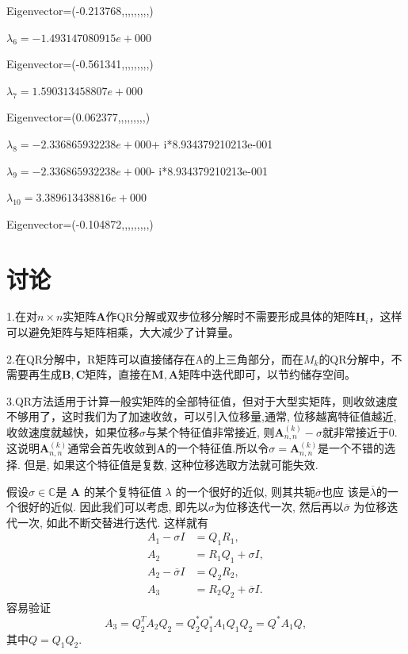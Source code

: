 \begin{landscape}
Eigenvector=(-0.213768,,,,,,,,,)


\vbox{}
$\lambda_{6}= -1.493147080915e+000$ 

Eigenvector=(-0.561341,,,,,,,,,)


\vbox{}
$\lambda_{7}= 1.590313458807e+000$ 

Eigenvector=(0.062377,,,,,,,,,)


\vbox{}
$\lambda_{8}= -2.336865932238e+000$+ i*8.934379210213e-001


\vbox{}
$\lambda_{9}= -2.336865932238e+000$- i*8.934379210213e-001


\vbox{}
$\lambda_{10}= 3.389613438816e+000$ 

Eigenvector=(-0.104872,,,,,,,,,)
\end{landscape}
\chapter{讨论}
\normalsize
1.在对$n\times n$实矩阵$\bm{A}$作QR分解或双步位移分解时不需要形成具体的矩阵$\bm{H}_i$，这样可以避免矩阵与矩阵相乘，大大减少了计算量。

2.在QR分解中，R矩阵可以直接储存在A的上三角部分，而在$M_k$的QR分解中，不需要再生成$\bm{B},\bm{C}$矩阵，直接在$\bm{M},\bm{A}$矩阵中迭代即可，以节约储存空间。

3.QR方法适用于计算一般实矩阵的全部特征值，但对于大型实矩阵，则收敛速度不够用了，这时我们为了加速收敛，可以引入位移量,通常, 位移越离特征值越近,收敛速度就越快，如果位移$\sigma$与某个特征值非常接近, 则$\bm{A}_{n,n}^{(k)}-\sigma$就非常接近于0.
这说明$\bm{A}_{n,n}^{(k)}$通常会首先收敛到$\bm{A}$的一个特征值.所以令$\sigma=\bm{A}_{n,n}^{(k)}$是一个不错的选择.
但是, 如果这个特征值是复数, 这种位移选取方法就可能失效.

假设$\sigma \in \mathbb{C}$是 $\bm{A}$ 的某个复特征值 $\lambda$ 的一个很好的近似, 则其共轭$\overline{\sigma}$也应
该是$\overline{\lambda}$的一个很好的近似. 因此我们可以考虑, 即先以$\sigma$为位移迭代一次, 然后再以$\overline{\sigma}$ 为位移迭代一次, 如此不断交替进行迭代.
这样就有
\begin{align*}
A_1-\sigma I&=Q_1R_1, \\
A_2&=R_1Q_1+\sigma I,\\
A_2-\overline{\sigma}I&=Q_2R_2, \\
A_3&=R_2Q_2+\overline{\sigma}I.
\end{align*}
容易验证
\[A_3=Q_2^TA_2Q_2=Q_2^{\ast}Q_1^{\ast}A_1Q_1Q_2=Q^{\ast}A_1Q,
\]
其中$Q=Q_1Q_2$.

